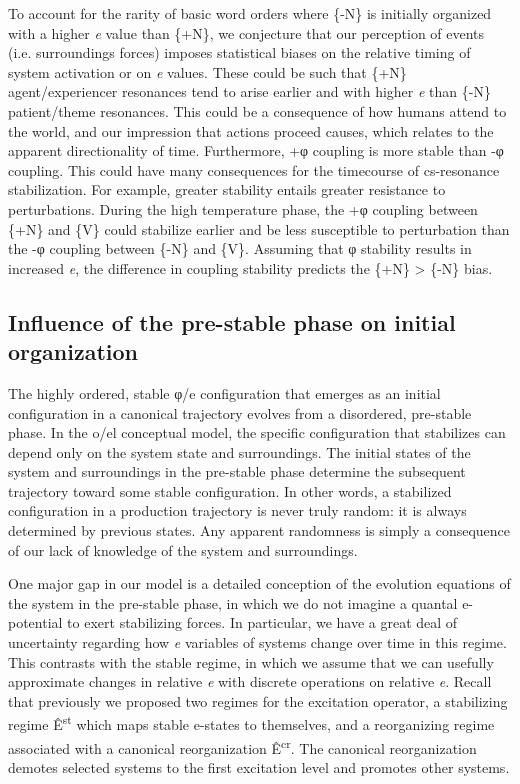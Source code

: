   To account for the rarity of basic word orders where \{-N\} is initially organized with a higher \textit{e} value than \{+N\}, we conjecture that our perception of events (i.e. surroundings forces) imposes statistical biases on the relative timing of system activation or on \textit{e} values. These could be such that \{+N\} agent/experiencer resonances tend to arise earlier and with higher \textit{e} than \{-N\} patient/theme resonances. This could be a consequence of how humans attend to the world, and our impression that actions proceed causes, which relates to the apparent directionality of time. Furthermore, +φ coupling is more stable than -φ coupling. This could have many consequences for the timecourse of cs-resonance stabilization. For example, greater stability entails greater resistance to perturbations. During the high temperature phase, the +φ coupling between \{+N\} and \{V\} could stabilize earlier and be less susceptible to perturbation than the -φ coupling between \{-N\} and \{V\}. Assuming that φ stability results in increased \textit{e}, the difference in coupling stability predicts the \{+N\} > \{-N\} bias.

\subsection{Influence of the pre-stable phase on initial organization}

The highly ordered, stable φ/e configuration that emerges as an initial configuration in a canonical trajectory evolves from a disordered, pre-stable phase. In the o/el conceptual model, the specific configuration that stabilizes can depend only on the system state and surroundings. The initial states of the system and surroundings in the pre-stable phase determine the subsequent trajectory toward some stable configuration. In other words, a stabilized configuration in a production trajectory is never truly random: it is always determined by previous states. Any apparent randomness is simply a consequence of our lack of knowledge of the system and surroundings.

  One major gap in our model is a detailed conception of the evolution equations of the system in the pre-stable phase, in which we do not imagine a quantal e-potential to exert stabilizing forces. In particular, we have a great deal of uncertainty regarding how \textit{e} variables of systems change over time in this regime. This contrasts with the stable regime, in which we assume that we can usefully approximate changes in relative \textit{e} with discrete operations on relative \textit{e}. Recall that previously we proposed two regimes for the excitation operator, a stabilizing regime Ê\textsuperscript{st} which maps stable e-states to themselves, and a reorganizing regime associated with a canonical reorganization Ê\textsuperscript{cr}. The canonical reorganization demotes selected systems to the first excitation level and promotes other systems. 

